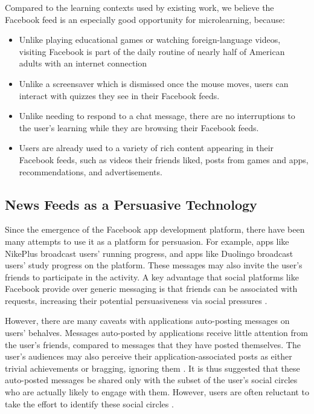 \documentclass{chi-ext}
\begin{document}
Compared to the learning contexts used by existing work, we believe the Facebook feed is an especially good opportunity for microlearning, because:

\begin{itemize}
\item Unlike playing educational games or watching foreign-language videos, visiting Facebook is part of the daily routine of nearly half of American adults with an internet connection \cite{socialmediaupdate} %
\item Unlike a screensaver which is dismissed once the mouse moves, users can interact with quizzes they see in their Facebook feeds.
\item Unlike needing to respond to a chat message, there are no interruptions to the user's learning while they are browsing their Facebook feeds.
\item Users are already used to a variety of rich content appearing in their Facebook feeds, such as videos their friends liked, posts from games and apps, recommendations, and advertisements.
\end{itemize}

\subsection{News Feeds as a Persuasive Technology}

Since the emergence of the Facebook app development platform, there have been
many attempts to use it as a platform for persuasion. For example, apps like NikePlus broadcast users' running progress, and apps like Duolingo broadcast users' study progress on the platform. These messages may also invite the user's friends to participate in the activity. A key advantage that social platforms like Facebook provide over generic messaging is that friends can be associated with requests, increasing their potential persuasiveness via social pressures \cite{foggfacebook}.

However, there are many caveats with applications auto-posting messages on users' behalves. Messages auto-posted by applications receive little attention from the user's friends, compared to messages that they have posted themselves. The user's audiences may also perceive their application-associated posts as either trivial achievements or bragging, ignoring them \cite{socialsharing}. It is thus suggested that these auto-posted messages be shared only with the subset of the user's social circles who are actually likely to engage with them. However, users are often reluctant to take the effort to identify these social circles \cite{socialsharing}.
\end{document}
